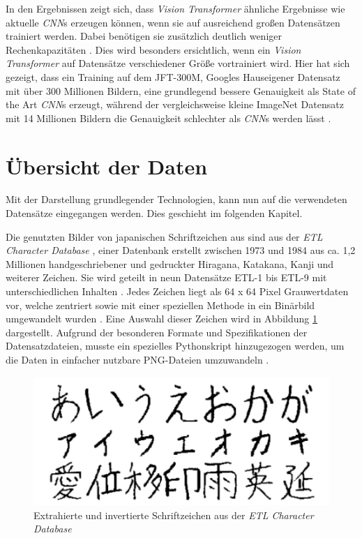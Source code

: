 \documentclass[twoside,a4paper]{IEEEtran}
\begin{document}
In den Ergebnissen zeigt sich, dass \emph{Vision Transformer} ähnliche Ergebnisse wie aktuelle \emph{CNN}s erzeugen können, wenn sie auf ausreichend großen Datensätzen trainiert werden. Dabei benötigen sie zusätzlich deutlich weniger Rechenkapazitäten \cite[S.5]{VIT}. Dies wird besonders ersichtlich, wenn ein \emph{Vision Transformer} auf Datensätze verschiedener Größe vortrainiert wird. Hier hat sich gezeigt, dass ein Training auf dem JFT-300M, Googles Hauseigener Datensatz mit über 300 Millionen Bildern, eine grundlegend bessere Genauigkeit als State of the Art \emph{CNN}s erzeugt, während der vergleichsweise kleine ImageNet Datensatz mit 14 Millionen Bildern \cite{IMAGENET} die Genauigkeit schlechter als \emph{CNN}s werden lässt \cite{JFT}.
\section{Übersicht der Daten} %
Mit der Darstellung grundlegender Technologien, kann nun auf die verwendeten Datensätze eingegangen werden. Dies geschieht im folgenden Kapitel.

Die genutzten Bilder von japanischen Schriftzeichen aus \cite{RHC} sind aus der \emph{ETL Character Database} \cite[S.2-3]{RHC}, einer Datenbank erstellt zwischen 1973 und 1984 aus ca. 1,2 Millionen handgeschriebener und gedruckter Hiragana, Katakana, Kanji und weiterer Zeichen. Sie wird geteilt in neun Datensätze ETL-1 bis ETL-9 mit unterschiedlichen Inhalten \cite{ETL}. Jedes Zeichen liegt als 64 x 64 Pixel Grauwertdaten vor, welche zentriert sowie mit einer speziellen Methode in ein Binärbild umgewandelt wurden \cite[S.3]{RHC}. Eine Auswahl dieser Zeichen wird in Abbildung \ref{kana} dargestellt. Aufgrund der besonderen Formate und Spezifikationen der Datensatzdateien, musste ein spezielles Pythonskript hinzugezogen werden, um die Daten in einfacher nutzbare PNG-Dateien umzuwandeln \cite{ETL_FORMATS}.
 
\begin{figure}[!htb]
	\includegraphics[width=\columnwidth]{kana}
	\caption{Extrahierte und invertierte Schriftzeichen aus der \emph{ETL Character Database} \cite[S.1]{RHC}}
	\label{kana}
\end{figure}
\end{document}
